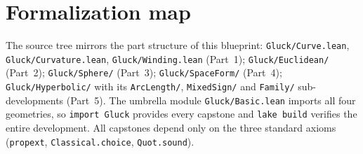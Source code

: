 \section{Formalization map}

The source tree mirrors the part structure of this blueprint:
\texttt{Gluck/Curve.lean}, \texttt{Gluck/Curvature.lean},
\texttt{Gluck/Winding.lean} (Part~1);
\texttt{Gluck/Euclidean/} (Part~2);
\texttt{Gluck/Sphere/} (Part~3);
\texttt{Gluck/SpaceForm/} (Part~4);
\texttt{Gluck/Hyperbolic/} with its \texttt{ArcLength/}, \texttt{MixedSign/}
and \texttt{Family/} sub-developments (Part~5).
The umbrella module \texttt{Gluck/Basic.lean} imports all four geometries, so
\texttt{import Gluck} provides every capstone and \texttt{lake build} verifies
the entire development. All capstones depend only on the three standard axioms
(\texttt{propext}, \texttt{Classical.choice}, \texttt{Quot.sound}).
